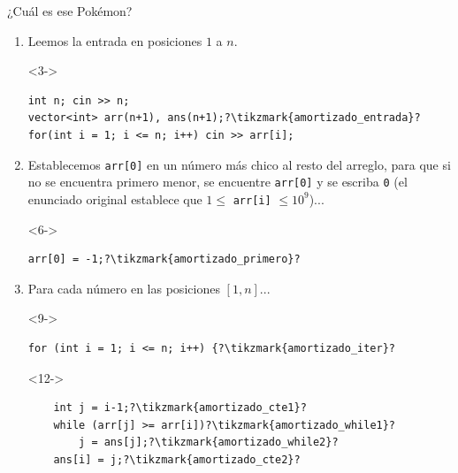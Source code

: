 \documentclass{beamer}
\begin{document}
    \begin{frame}[fragile]{¿Cuál es ese Pokémon?}

        \begin{enumerate}
            \item<2-> Leemos la entrada en posiciones $1$ a $n$. 

            \begin{actionenv}<3->
            \begin{verbatim}
int n; cin >> n;
vector<int> arr(n+1), ans(n+1);?\tikzmark{amortizado_entrada}?
for(int i = 1; i <= n; i++) cin >> arr[i];
            \end{verbatim}
            \end{actionenv}

            \item<5-> Establecemos \texttt{arr[0]} en un número más chico al resto del arreglo, para que si no se encuentra primero menor, se encuentre \texttt{arr[0]} y se escriba \texttt{0} (el enunciado original establece que $1 \leq$ \texttt{arr[i]} $\leq 10^9$)...\vspace{2pt}

            \begin{actionenv}<6->
            \begin{verbatim}
arr[0] = -1;?\tikzmark{amortizado_primero}?
            \end{verbatim}
            \end{actionenv}

            \item<8-> Para cada número en las posiciones $[1,n]$...\vspace{2pt}

            \begin{actionenv}<9->
            \begin{verbatim}
for (int i = 1; i <= n; i++) {?\tikzmark{amortizado_iter}?
            \end{verbatim}
            \end{actionenv}

        
            \begin{actionenv}<12->
            \begin{verbatim}
    int j = i-1;?\tikzmark{amortizado_cte1}?
    while (arr[j] >= arr[i])?\tikzmark{amortizado_while1}?
        j = ans[j];?\tikzmark{amortizado_while2}?
    ans[i] = j;?\tikzmark{amortizado_cte2}?
            \end{verbatim}
            \end{actionenv}


\end{enumerate}
\end{frame}
\end{document}

